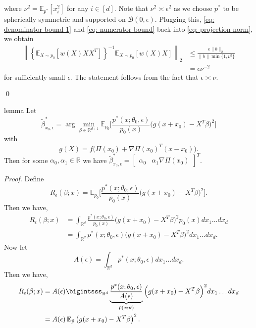\documentclass[11pt]{article}
\begin{document}
where $\nu^2 = \mathbb{E}_{p^*}[x_i^2]$ for any $i \in [d]$. Note that $\nu^2 \asymp \epsilon^2$ as we choose $p^*$ to be spherically symmetric and supported on $\mathcal{B}(0, \epsilon)$. Plugging this, \cref{eq: denominator bound 1} and \cref{eq: numerator bound} back into \cref{eq: projection norm}, we obtain
\begin{align*}
    \left\|\left\{\mathbb{E}_{X\sim p_0}[w(X)XX^{T}]\right\}^{-1}\mathbb{E}_{X \sim p_0}[w(X)X]\right\|_2 &\leq \frac{\epsilon\|b\|_2}{\|b\|\min\{1, \nu^2\}} \\
    &= \epsilon\nu^{-2}
\end{align*}
for sufficiently small $\epsilon$. The statement follows from the fact that $\epsilon \asymp \nu$.

\qed{}


\begin{restatable}[Surrogate]{lemma}{} \label{lemma: surrogate problem} Let 
\[\tilde{\beta}^*_{x_0, \epsilon} = \arg\min_{\beta \in \mathbb{R}^{d+1}}\mathbb{E}_{ p_{0}}\Big[\frac{p^*(x;\theta_0, \epsilon)}{p_{0}(x)}\Big(g(x + x_0) - X^{T}\beta \Big)^2\Big]\]
with 
\[g(X) = f\Big(\Pi(x_0) + \nabla\Pi(x_0)^{T}(x-x_0)\Big).\]
Then for some $\alpha_0, \alpha_1 \in \mathbb{R}$ we have $\tilde{\beta}^*_{x_0, \epsilon} = \begin{bmatrix}\alpha_0  & \alpha_1\nabla \Pi(x_0) \end{bmatrix}^T$. 
\end{restatable}
\noindent \textit{Proof.} Define 
\[R_{\epsilon}(\beta; x) = \mathbb{E}_{ p_{0}}\Big[\frac{p^*(x;\theta_0, \epsilon)}{p_{0}(x)}\Big(g(x + x_0) - X^{T}\beta\Big)^2\Big].\]
Then we have,
\begin{align*}
    R_{\epsilon}(\beta; x)&= \int_{\mathbb{R}^d}\frac{p^*(x;\theta_0, \epsilon)}{p_{0}(x)}\Big(g(x+x_0) - X^{T}\beta\Big)^2p_{0}(x) dx_1 \dots dx_d \\
    &= \int_{\mathbb{R}^d}p^*(x;\theta_0, \epsilon)\Big(g(x + x_0) - X^{T}\beta \Big)^2 dx_1 \dots dx_d.
\end{align*}
Now let 
\begin{equation}
    A(\epsilon) = \int_{\mathbb{R}^d} p^*(x;\theta_0, \epsilon) dx_1 \dots dx_d.
\end{equation}
Then we have,
\begin{align*}
    R_{\epsilon}(\beta; x)&= A(\epsilon) \bigintsss_{\mathbb{R}^d}\underbrace{\frac{p^*(x;\theta_0, \epsilon)}{A(\epsilon)}}_{\tilde{p}(x;\vartheta)}\Big(g(x+x_0) - X^{T}\beta \Big)^2 dx_1 \dots dx_d \\
    &= A(\epsilon)\, \mathbb{E}_{ \tilde{p}}\left(g(x+x_0)-X^{T}\beta\right)^2.
\end{align*}
\end{document}
